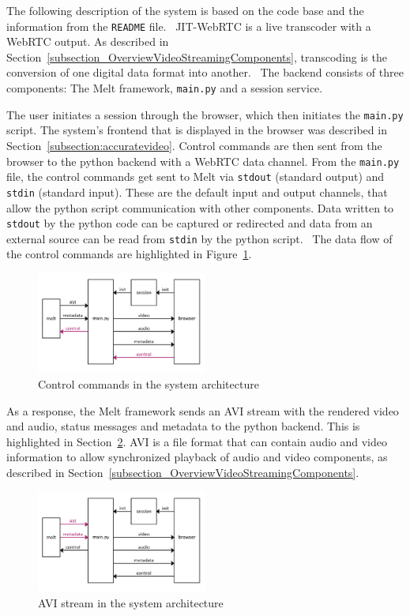 \documentclass[../MasterThesis.tex]{subfiles}
\begin{document}
The following description of the system is based on the code base and the information from the \texttt{README} file.~\cite{RM_Backend}
JIT-WebRTC is a live transcoder with a WebRTC output. As described in Section~\ref{subsection_OverviewVideoStreamingComponents}, transcoding is the conversion of one digital data format into another.~\cite{transcoding}
The backend consists of three components: The Melt framework, \texttt{main.py} and a session service.


The user initiates a session through the browser, which then initiates the \texttt{main.py} script. The system's frontend that is displayed in the browser was described in Section~\ref{subsection:accuratevideo}.
Control commands are then sent from the browser to the python backend with a WebRTC data channel.
From the \texttt{main.py} file, the control commands get sent to Melt via \texttt{stdout} (standard output) and \texttt{stdin} (standard input). These are the default input and output channels, that allow the python script communication with other components.
Data written to \texttt{stdout} by the python code can be captured or redirected and data from an external source can be read from \texttt{stdin} by the python script.~\cite{python} The data flow of the control commands are highlighted in Figure~\ref{figure:controlcommands}.

\begin{figure}[H]
	\centering
	\includegraphics[width=0.5\textwidth]{IM_control.png}
	\caption{Control commands in the system architecture}
	\label{figure:controlcommands}
\end{figure}


As a response, the Melt framework sends an AVI stream with the rendered video and audio, status messages and metadata to the python backend. This is highlighted in Section~\ref{figure:avimetadata}.
AVI is a file format that can contain audio and video information to allow synchronized playback of audio and video components, as described in Section~\ref{subsection_OverviewVideoStreamingComponents}.~\cite{avi} 

\begin{figure}[H]
	\centering
	\includegraphics[width=0.5\textwidth]{IM_avi.png}
	\caption{AVI stream in the system architecture}
	\label{figure:avimetadata}
\end{figure}
\end{document}
